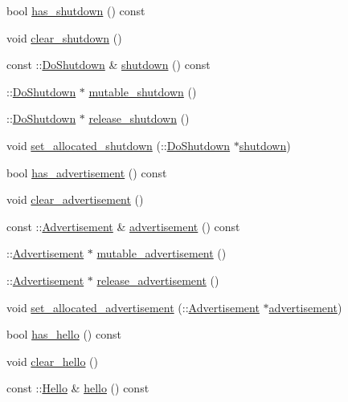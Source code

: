 \begin{DoxyCompactItemize}
\item 
bool \hyperlink{class_message_a828967ea849f5536979f42d8bfb1db81}{has\+\_\+shutdown} () const 
\item 
void \hyperlink{class_message_a0af7e8f920d051736f92968f3c4f8046}{clear\+\_\+shutdown} ()
\item 
const \+::\hyperlink{class_do_shutdown}{Do\+Shutdown} \& \hyperlink{class_message_aab2ea329fff8637bc696e7979eadc827}{shutdown} () const 
\item 
\+::\hyperlink{class_do_shutdown}{Do\+Shutdown} $\ast$ \hyperlink{class_message_a3e3d6de62220b9b1dc4bd476ddb1c6ab}{mutable\+\_\+shutdown} ()
\item 
\+::\hyperlink{class_do_shutdown}{Do\+Shutdown} $\ast$ \hyperlink{class_message_aa2f2ec957125d1cd4030dcc499c19ad7}{release\+\_\+shutdown} ()
\item 
void \hyperlink{class_message_aabcdaa4db978dd877e117297ea555af4}{set\+\_\+allocated\+\_\+shutdown} (\+::\hyperlink{class_do_shutdown}{Do\+Shutdown} $\ast$\hyperlink{class_message_aab2ea329fff8637bc696e7979eadc827}{shutdown})
\item 
bool \hyperlink{class_message_ab599ad42dc51bb64f4a1f54ab687052f}{has\+\_\+advertisement} () const 
\item 
void \hyperlink{class_message_a65ab7f4447d5f33c839cd9f889d053fc}{clear\+\_\+advertisement} ()
\item 
const \+::\hyperlink{class_advertisement}{Advertisement} \& \hyperlink{class_message_ad837be1ca50959f5e3a46abb0283a9d0}{advertisement} () const 
\item 
\+::\hyperlink{class_advertisement}{Advertisement} $\ast$ \hyperlink{class_message_a1569a203e1c3b8ee7961c02a46280269}{mutable\+\_\+advertisement} ()
\item 
\+::\hyperlink{class_advertisement}{Advertisement} $\ast$ \hyperlink{class_message_a65a766ceb0dd2a5b3a37e0500b245e2c}{release\+\_\+advertisement} ()
\item 
void \hyperlink{class_message_a73b5a21942f1206693d911ea6357f302}{set\+\_\+allocated\+\_\+advertisement} (\+::\hyperlink{class_advertisement}{Advertisement} $\ast$\hyperlink{class_message_ad837be1ca50959f5e3a46abb0283a9d0}{advertisement})
\item 
bool \hyperlink{class_message_ae2dc15c9e2b35d4659117baea58f7ad6}{has\+\_\+hello} () const 
\item 
void \hyperlink{class_message_aa5146ec2842b67ec3fbd1ad3f7efa76d}{clear\+\_\+hello} ()
\item 
const \+::\hyperlink{class_hello}{Hello} \& \hyperlink{class_message_a898179de741961b94361a2afa251dea0}{hello} () const 

\end{DoxyCompactItemize}
